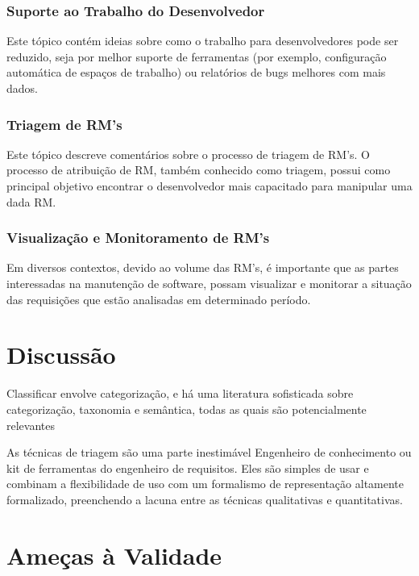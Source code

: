 \subsubsection{Suporte ao Trabalho do Desenvolvedor}

Este tópico contém ideias sobre como o trabalho para desenvolvedores pode ser
reduzido, seja por melhor suporte de ferramentas (por exemplo, configuração
automática de espaços de trabalho) ou relatórios de bugs melhores com mais
dados.

\subsubsection{Triagem de RM's}

Este tópico descreve comentários sobre o processo de triagem de RM's. O processo
de atribuição de RM, também conhecido como triagem, possui como principal
objetivo encontrar o desenvolvedor mais capacitado para manipular uma dada RM\@.

\subsubsection{Visualização e Monitoramento de RM's}

Em diversos contextos, devido ao volume das RM's, é importante que as partes
interessadas na manutenção de software, possam visualizar e monitorar a situação
das requisições que estão analisadas em determinado período.

\section{Discussão}
\label{sec:discussao}

Classificar envolve categorização, e há uma literatura sofisticada sobre
categorização, taxonomia e semântica, todas as quais são potencialmente
relevantes~\cite{rugg2005sorting}

As técnicas de triagem são uma parte inestimável Engenheiro de conhecimento ou
kit de ferramentas do engenheiro de requisitos.  Eles são simples de usar e
combinam a flexibilidade de uso com um formalismo de representação altamente
formalizado, preenchendo a lacuna entre as técnicas qualitativas e
quantitativas.

\section{Ameças à Validade}
\label{sec:ameacas_a_validade}

